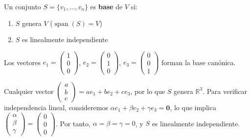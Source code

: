 \begin{definition}[Base] 
Un conjunto $S = \{v_1, \dots, v_n\}$ es \textbf{base} de $V$ si:
\begin{enumerate}
\item $S$ genera $V$ ($\operatorname{span}(S) = V$)
\item $S$ es linealmente independiente
\end{enumerate} 
\end{definition}

\begin{example}
Los vectores $e_1 = \begin{pmatrix} 1\\0\\0 \end{pmatrix}$, $e_2 = \begin{pmatrix} 0\\1\\0 \end{pmatrix}$, $e_3 = \begin{pmatrix} 0\\0\\1 \end{pmatrix}$ forman la base canónica. 
\begin{myproof}
Cualquier vector $\begin{pmatrix} a\\b\\c \end{pmatrix} = ae_1 + be_2 + ce_3$, por lo que $S$ genera $\mathbb{R}^3$. Para verificar independencia lineal, consideremos $\alpha e_1 + \beta e_2 + \gamma e_3 = \mathbf{0}$, lo que implica $\begin{pmatrix} \alpha\\\beta\\\gamma \end{pmatrix} = \begin{pmatrix} 0\\0\\0 \end{pmatrix}$. Por tanto, $\alpha = \beta = \gamma = 0$, y $S$ es linealmente independiente.
\end{myproof}
\end{example}


